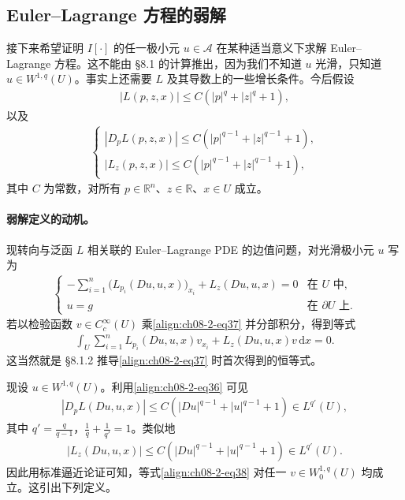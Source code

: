 \documentclass[../../main.tex]{subfiles}
\begin{document}
\subsection{Euler--Lagrange 方程的弱解}\label{subsection:ch08-2-3-EulerLagrange弱解}

接下来希望证明 $I[\cdot]$ 的任一极小元 $u\in\mathcal{A}$ 在某种适当意义下求解 Euler--Lagrange 方程。这不能由 \S8.1 的计算推出，因为我们不知道 $u$ 光滑，只知道 $u\in W^{1,q}(U)$。事实上还需要 $L$ 及其导数上的一些增长条件。今后假设
\begin{align}
|L(p,z,x)|\leqslant C(|p|^q+|z|^q+1),\label{align:ch08-2-eq35}
\end{align}
以及
\begin{align}
\begin{cases}
|D_pL(p,z,x)|\leqslant C(|p|^{q-1}+|z|^{q-1}+1),\\
|L_z(p,z,x)|\leqslant C(|p|^{q-1}+|z|^{q-1}+1),
\end{cases}\label{align:ch08-2-eq36}
\end{align}
其中 $C$ 为常数，对所有 $p\in\mathbb{R}^n$、$z\in\mathbb{R}$、$x\in U$ 成立。

\paragraph{弱解定义的动机。}现转向与泛函 $L$ 相关联的 Euler--Lagrange PDE 的边值问题，对光滑极小元 $u$ 写为
\begin{align}
\begin{cases}
-\sum_{i=1}^n\big(L_{p_i}(Du,u,x)\big)_{x_i}+L_z(Du,u,x)=0&\text{在 }U\text{ 中},\\
u=g&\text{在 }\partial U\text{ 上}.
\end{cases}\label{align:ch08-2-eq37}
\end{align}
若以检验函数 $v\in C_c^\infty(U)$ 乘\eqref{align:ch08-2-eq37} 并分部积分，得到等式
\begin{align}
\int_U\sum_{i=1}^n L_{p_i}(Du,u,x)v_{x_i}+L_z(Du,u,x)v\,\mathrm{d}x=0.\label{align:ch08-2-eq38}
\end{align}
这当然就是 \S8.1.2 推导\eqref{align:ch08-2-eq37} 时首次得到的恒等式。

现设 $u\in W^{1,q}(U)$。利用\eqref{align:ch08-2-eq36} 可见
\begin{align*}
|D_pL(Du,u,x)|\leqslant C(|Du|^{q-1}+|u|^{q-1}+1)\in L^{q'}(U),
\end{align*}
其中 $q'=\frac{q}{q-1}$，$\frac1q+\frac1{q'}=1$。类似地
\begin{align}
|L_z(Du,u,x)|\leqslant C(|Du|^{q-1}+|u|^{q-1}+1)\in L^{q'}(U).\label{align:ch08-2-eq39}
\end{align}
因此用标准逼近论证可知，等式\eqref{align:ch08-2-eq38} 对任一 $v\in W_0^{1,q}(U)$ 均成立。这引出下列定义。
\end{document}
